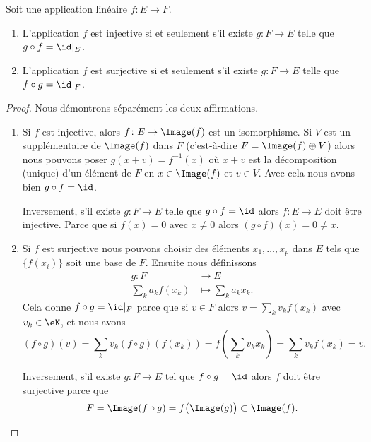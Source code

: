 \begin{lemma}        \label{LEMooDAACooElDsYb}
    Soit une application linéaire \( f\colon E\to F\).
    \begin{enumerate}
        \item       \label{ITEMooEZEWooZGoqsZ}
            L'application \( f\) est injective si et seulement s'il existe \( g\colon F\to E\) telle que \( g\circ f=\id|_E\).
        \item
            L'application \( f\) est surjective si et seulement s'il existe \( g\colon F\to E\) telle que \( f\circ g=\id|_F\).
    \end{enumerate}
\end{lemma}

\begin{proof}
    Nous démontrons séparément les deux affirmations.
    \begin{enumerate}
        \item
            Si \( f\) est injective, alors \( f\colon E\to \Image(f)\) est un isomorphisme. Si $V$ est un supplémentaire de \( \Image(f)\) dans \( F\) (c'est-à-dire \( F=\Image(f)\oplus V\)) alors nous pouvons poser \( g(x+v)=f^{-1}(x)\) où \( x+v\) est la décomposition (unique) d'un élément de \( F\) en \( x\in\Image(f)\) et \( v\in V\). Avec cela nous avons bien \( g\circ f=\id\).

            Inversement, s'il existe \( g\colon F\to E\) telle que \( g\circ f=\id\) alors \( f\colon E\to E\) doit être injective. Parce que si \( f(x)=0\) avec \( x\neq 0\) alors \( (g\circ f)(x)=0\neq x\).
        \item
            Si \( f\) est surjective nous pouvons choisir des éléments \( x_1,\ldots, x_p\) dans \( E\) tels que \( \{ f(x_i) \}\) soit une base de \( F\). Ensuite nous définissons
            \begin{equation}
                \begin{aligned}
                    g\colon F&\to E \\
                    \sum_k a_k f(x_k)&\mapsto \sum_k a_k x_k.
                \end{aligned}
            \end{equation}
            Cela donne \(  f\circ g=\id|_F\) parce que si \( v\in F\) alors \( v=\sum_kv_kf(x_k)\) avec \( v_k\in \eK\), et nous avons
            \begin{equation}
                (f\circ g)(v)=\sum_k v_k (f\circ g) \left(f(x_k)\right)
                             =f\left( \sum_k v_k x_k \right)
                             =\sum_k v_k f(x_k) = v.
            \end{equation}

            Inversement, s'il existe \( g\colon F\to E\) tel que \( f\circ g=\id\) alors \( f\) doit être surjective parce que
            \begin{equation}
                F=\Image(f\circ g)=f\big( \Image(g) \big)\subset \Image(f).
            \end{equation}
    \end{enumerate}
\end{proof}


